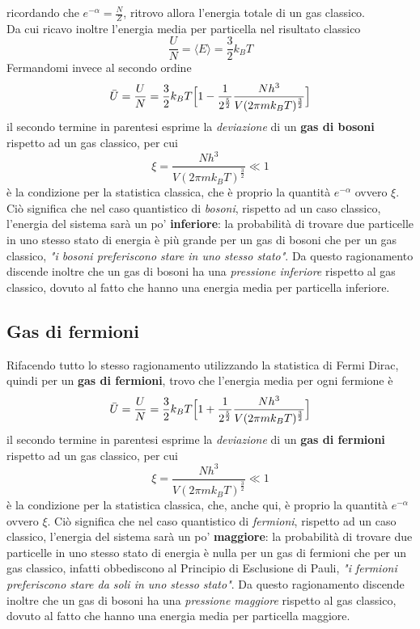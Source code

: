 ricordando che $e^{ -\alpha } = \frac{N}{Z}$, ritrovo allora l'energia totale di un gas classico. \\
Da cui ricavo inoltre l'energia media per particella nel risultato classico
\begin{equation}
\frac{U}{N} = \langle E \rangle = \frac{3}{2} k_B T
\end{equation}
Fermandomi invece al secondo ordine
\begin{equation}
\bar U = \frac{U}{N} = \frac{3}{2} k_B T \Bigl[  1 - \frac{1}{2^{ \frac{5}{2} }}  \frac{N h^3}{V (2\pi m k_B T)^{ \frac{3}{2} }}  \Bigr]
\end{equation}
il secondo termine in parentesi esprime la \textit{deviazione} di un \textbf{gas di bosoni} rispetto ad un gas classico, per cui
\begin{equation}
\xi = \frac{N h^3}{V (2\pi m k_B T)^{ \frac{3}{2} }}  \ll 1 
\end{equation}
è la condizione per la statistica classica, che è proprio la quantità $e^{-\alpha}$ ovvero $\xi$.
Ciò significa che nel caso quantistico di \textit{bosoni}, rispetto ad un caso classico, l'energia del sistema sarà un po' \textbf{inferiore}:
la probabilità di trovare due particelle in uno stesso stato di energia è più grande per un gas di bosoni che per un gas classico, \textit{"i bosoni preferiscono stare in uno stesso stato"}.
Da questo ragionamento discende inoltre che un gas di bosoni ha una \textit{pressione inferiore} rispetto al gas classico, dovuto al fatto che hanno una energia media per particella inferiore.

\subsection{Gas di fermioni} Rifacendo tutto lo stesso ragionamento utilizzando la statistica di Fermi Dirac, quindi per un \textbf{gas di fermioni}, trovo che l'energia media per ogni fermione è 
\begin{equation}
\bar U = \frac{U}{N} = \frac{3}{2} k_B T \Bigl[  1 + \frac{1}{2^{ \frac{5}{2} }} \frac{N h^3}{V (2\pi m k_B T)^{ \frac{3}{2} }} \Bigr]
\end{equation}
il secondo termine in parentesi esprime la \textit{deviazione} di un \textbf{gas di fermioni} rispetto ad un gas classico, per cui
\begin{equation}
\xi = \frac{N h^3}{V (2\pi m k_B T)^{ \frac{3}{2} }}  \ll 1 
\end{equation}
è la condizione per la statistica classica, che, anche qui, è proprio la quantità $e^{-\alpha}$ ovvero $\xi$.
Ciò significa che nel caso quantistico di \textit{fermioni}, rispetto ad un caso classico, l'energia del sistema sarà un po' \textbf{maggiore}:
la probabilità di trovare due particelle in uno stesso stato di energia è nulla per un gas di fermioni che per un gas classico, infatti obbediscono al Principio di Esclusione di Pauli, \textit{"i fermioni preferiscono stare da soli in uno stesso stato"}.
Da questo ragionamento discende inoltre che un gas di bosoni ha una \textit{pressione maggiore} rispetto al gas classico, dovuto al fatto che hanno una energia media per particella maggiore.

